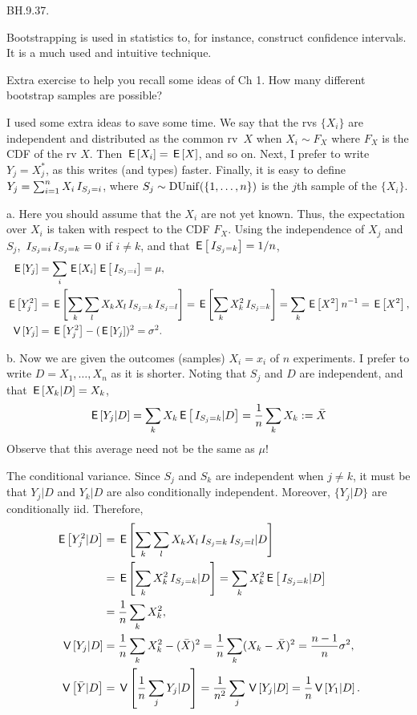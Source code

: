 \begin{exercise}
BH.9.37.

Bootstrapping is used in statistics to, for instance, construct confidence intervals. It is a much used and intuitive technique.

Extra exercise to  help you recall some ideas of Ch 1. How many different bootstrap samples are possible?

I used some extra ideas to save some time. We say that the rvs $\{X_i\}$ are independent and  distributed as the common rv~$X$ when $X_i\sim F_X$ where $F_X$ is the CDF of the rv $X$. Then $\,\mathsf{E}\left[X_{i}\right]=\,\mathsf{E}\left[X\right]$, and so on.  Next,  I prefer to write $Y_{j}= X_j^{*}$, as this writes (and types) faster. Finally,  it is easy to define
$Y_j = \sum_{i=1}^n X_i\,I_{S_j = i}$, where $S_{j}\sim \mathrm{DUnif}(\{1, \ldots, n\})$ is the \(j\)th sample of the $\{X_{i}\}$.
 \begin{solution}

a. Here you should assume that the $X_i$ are not yet known. Thus, the expectation over $X_i$ is taken with respect to the CDF $F_X$. Using the independence of $X_j$ and $S_j$, $\,I_{S_j=i}\,I_{S_j=k} = 0$ if $i\neq k$, and that $\,\mathsf{E}\left[\,I_{S_j=k}\right] = 1/n$,
\begin{align*}
\,\mathsf{E}\left[Y_j\right] &= \sum_i \,\mathsf{E}\left[X_i\right]\,\mathsf{E}\left[\,I_{S_{j}=i}\right] = \mu, \\
\,\mathsf{E}\left[Y_j^2\right]  &= \,\mathsf{E}\left[\sum_k\sum_{l} X_k X_{l} \,I_{S_j=k}\,I_{S_{j}=l}\right]
= \,\mathsf{E}\left[\sum_k X_k^{2}  \,I_{S_j=k}\right] =\sum_{k} \,\mathsf{E}\left[X^{2}\right] n^{-1} = \,\mathsf{E}\left[X^{2}\right], \\
\,\mathsf{V}\left[Y_j\right]&= \,\mathsf{E}\left[Y_j^{2}\right]- (\,\mathsf{E}\left[Y_{j}\right])^{2} = \sigma^{2}.
\end{align*}

b. Now we are given the outcomes (samples) $X_i=x_i$ of $n$ experiments.
I prefer to write $D = X_{1}, \ldots, X_{n}$ as it is shorter.
Noting that $S_j$ and $D$ are independent, and that $\,\mathsf{E}\left[X_{k}|D\right] = X_{k}$,
\begin{align*}
  \,\mathsf{E}\left[Y_{j}|D\right] = \sum_k X_k \,\mathsf{E}\left[\,I_{S_j=k}|D\right] = \frac 1 n \sum_k X_k := \bar X
\end{align*}
Observe that this average  need  not be the same as $\mu$!

The conditional variance. Since $S_j$ and $S_k$ are independent when $j\neq k$, it must be that $Y_j|D$ and $Y_k|D$ are also conditionally independent. Moreover, $\{Y_j|D\}$ are conditionally iid. Therefore,
\begin{align*}
\,\mathsf{E}\left[Y_{j}^{2}|D\right]
&= \,\mathsf{E}\left[\sum_k\sum_l X_kX_l\,I_{S_j=k}\,I_{S_j=l}|D\right] \\
&= \,\mathsf{E}\left[\sum_kX_k^{2}\,I_{S_j=k}|D\right]  = \sum_kX_k^{2}\,\mathsf{E}\left[\,I_{S_j=k}|D\right] \\
&= \frac 1 n \sum_{k} X_k^{2}, \\
\,\mathsf{V}\left[Y_j| D\right] &= \frac 1 n \sum_{k} X_k^{2} - (\bar X)^{2} = \frac 1 n \sum_{k} (X_k - \bar X)^{2} = \frac{n-1}n \sigma^{2},\\
\,\mathsf{V}\left[\bar Y|D\right] &= \,\mathsf{V}\left[\frac 1 n\sum_{j}Y_{j}|D\right] = \frac 1{n^{2}} \sum_j \,\mathsf{V}\left[Y_j|D\right] = \frac 1 n \,\mathsf{V}\left[Y_1|D\right].
\end{align*}



\end{solution}
\end{exercise}
